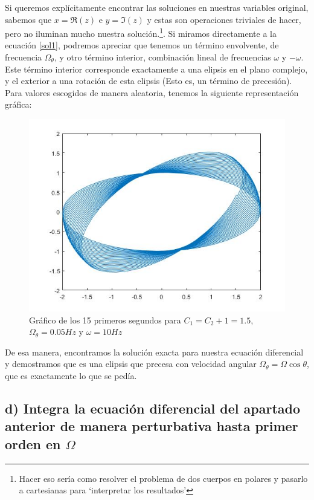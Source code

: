 \documentclass[a4paper,12pt]{article}
\begin{document}
Si queremos explícitamente encontrar las soluciones en nuestras variables original, sabemos que $x = \Re (z)$ e $y = \Im (z)$ y estas son operaciones triviales de hacer, pero no iluminan mucho nuestra solución.\footnote{Hacer eso sería como resolver el problema de dos cuerpos en polares y pasarlo a cartesianas para `interpretar los resultados'}. Si miramos directamente a la ecuación \eqref{sol1}, podremos apreciar que tenemos un término envolvente, de frecuencia $\Omega_{\theta}$, y otro término interior, combinación lineal de frecuencias $\omega$ y $-\omega$. Este término interior corresponde exactamente a una elipsis en el plano complejo, y el exterior a una rotación de esta elipsis (Esto es, un término de precesión). Para valores escogidos de manera aleatoria, tenemos la siguiente representación gráfica:

\begin{figure}
  \centering
  \includegraphics[width=\textwidth]{foucgraph.jpg}
  \caption{Gráfico de los 15 primeros segundos para $C_1 = C_2 + 1 = 1.5 $, $\Omega_\theta = 0.05 Hz$ y $\omega = 10 Hz$}
\end{figure}

De esa manera, encontramos la solución exacta para nuestra ecuación diferencial y demostramos que es una elipsis que precesa con velocidad angular $\Omega_\theta = \Omega \cos\theta$, que es exactamente lo que se pedía.

\subsection*{d) Integra la ecuación diferencial del apartado anterior de manera perturbativa hasta primer orden en $\Omega$}
\end{document}
